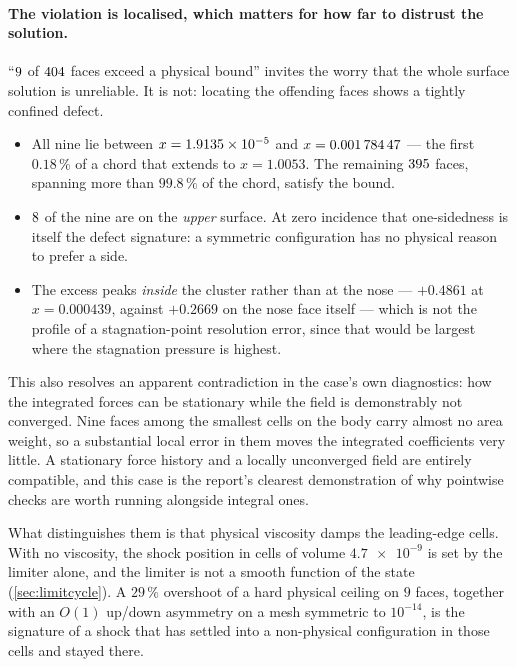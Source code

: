 \paragraph{The violation is localised, which matters for how far to distrust the solution.}
``$\num{9}$ of $\num{404}$ faces exceed a physical
bound'' invites the worry that the whole surface
solution is unreliable. It is not: locating the offending faces shows a tightly confined
defect.
\begin{itemize}
  \item All nine lie between $x=\num{1.9135e-05}$ and
  $x=\num{0.00178447}$ --- the first $0.18\,\%$ of a
  chord that extends to $x=1.0053$. The remaining $\num{395}$ faces,
  spanning more than $99.8\,\%$ of the chord, satisfy the bound.
  \item $\num{8}$ of the nine are on the \emph{upper} surface. At zero
  incidence that
  one-sidedness is itself the defect signature: a symmetric configuration has no physical
  reason to prefer a side.
  \item The excess peaks \emph{inside} the cluster rather than at the nose --- $+0.4861$ at
  $x=0.000439$, against $+0.2669$ on the nose face itself --- which is not the profile of a
  stagnation-point resolution error, since that would be largest where the stagnation
  pressure is highest.
\end{itemize}

This also resolves an apparent contradiction in the case's own diagnostics: how the
integrated forces can be stationary while the field is demonstrably not converged. Nine
faces among the smallest cells on the body carry almost no area weight, so a substantial
local error in them moves the integrated coefficients very little. A stationary force
history and a locally unconverged field are entirely compatible, and this case is the
report's clearest demonstration of why pointwise checks are worth running alongside
integral ones.

What distinguishes them is that physical viscosity damps the leading-edge cells. With no
viscosity, the shock position in cells of volume $\num{4.7e-9}$ is set by the limiter
alone, and the limiter is not a smooth function of the state (\cref{sec:limitcycle}).
A $29\,\%$ overshoot of a hard physical ceiling on $9$ faces, together with an $O(1)$
up/down asymmetry on a mesh symmetric to $10^{-14}$, is the signature of a shock that has
settled into a non-physical configuration in those cells and stayed there.

